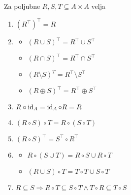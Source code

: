 \documentclass[12pt, a4paper]{article}
\renewcommand{\implies}{\Rightarrow}
\begin{document}
\begin{izrek}
Za poljubne $R,S,T\subseteq A\times A$ velja

\begin{enumerate}
\item $(R^\top)^\top=R$
\item

\vspace{-6pt}
\begin{multicols}{2}
\begin{itemize}
\item$(R\cup S)^\top=R^\top\cup S^\top$
\item $(R\cap S)^\top=R^\top\cap S^\top$
\item $(R\setminus S)^T=R^\top\setminus S^\top$
\item $(R\oplus S)^\top=R^\top\oplus S^\top$
\end{itemize}
\end{multicols}
\vspace{-12pt}

\item $R\circ\operatorname{id}_A=\operatorname{id}_A\circ R=R$
\item $(R\circ S)\circ T=R\circ(S\circ T)$
\item $(R\circ S)^\top=S^\top\circ R^\top$
\item

\vspace{-6pt}
\begin{multicols}{2}
\begin{itemize}
\item $R\circ(S\cup T)=R\circ S\cup R\circ T$
\item $(R\cup S)\circ T=T\circ T\cup S\circ T$
\end{itemize}
\end{multicols}
\vspace{-12pt}

\item $R\subseteq S\implies R\circ T\subseteq S\circ T\land T\circ R\subseteq T\circ S$
\end{enumerate}
\end{izrek}

\obvs
\end{document}
